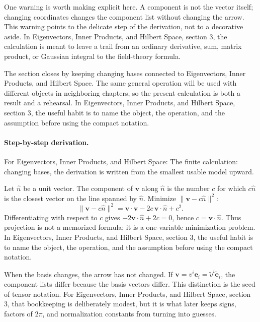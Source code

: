 One warning is worth making explicit here.  A component is not the vector itself; changing coordinates changes the component list without changing the arrow.  This warning points to the delicate step of the derivation, not to a decorative aside.  In Eigenvectors, Inner Products, and Hilbert Space, section 3, the calculation is meant to leave a trail from an ordinary derivative, sum, matrix product, or Gaussian integral to the field-theory formula.

The section closes by keeping changing bases connected to Eigenvectors, Inner Products, and Hilbert Space.  The same general operation will be used with different objects in neighboring chapters, so the present calculation is both a result and a rehearsal.  In Eigenvectors, Inner Products, and Hilbert Space, section 3, the useful habit is to name the object, the operation, and the assumption before using the compact notation.



\paragraph{Step-by-step derivation.}

For Eigenvectors, Inner Products, and Hilbert Space: The finite calculation: changing bases, the derivation is written from the smallest usable model upward.

Let \(\hat n\) be a unit vector.  The component of \(\bm v\) along \(\hat n\) is the number \(c\) for which \(c\hat n\) is the closest vector on the line spanned by \(\hat n\).  Minimize \(\|\bm v-c\hat n\|^2\):
\[
  \|\bm v-c\hat n\|^2=\bm v\cdot\bm v-2c\,\bm v\cdot\hat n+c^2.
\]
Differentiating with respect to \(c\) gives \(-2\bm v\cdot\hat n+2c=0\), hence \(c=\bm v\cdot\hat n\).  Thus projection is not a memorized formula; it is a one-variable minimization problem.  In Eigenvectors, Inner Products, and Hilbert Space, section 3, the useful habit is to name the object, the operation, and the assumption before using the compact notation.

When the basis changes, the arrow has not changed.  If \(\bm v=v^i\bm e_i=\tilde v^i\tilde{\bm e}_i\), the component lists differ because the basis vectors differ.  This distinction is the seed of tensor notation.  For Eigenvectors, Inner Products, and Hilbert Space, section 3, that bookkeeping is deliberately modest, but it is what later keeps signs, factors of \(2\pi\), and normalization constants from turning into guesses.

